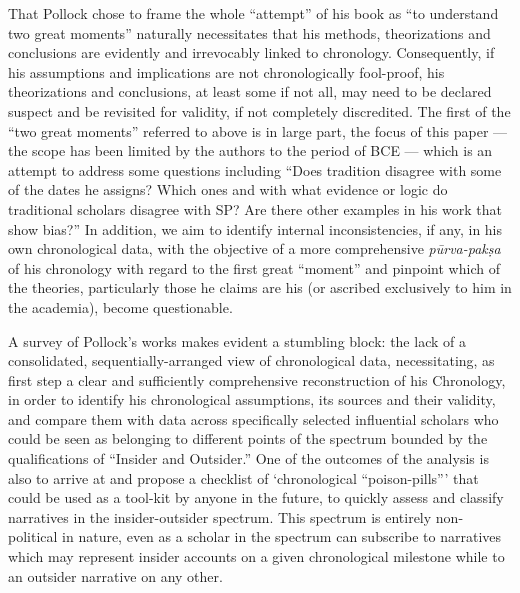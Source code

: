 That Pollock chose to frame the whole “attempt” of his book as “to understand two great moments” naturally necessitates that his methods, theorizations and conclusions are evidently and irrevocably linked to chronology. Consequently, if his assumptions and implications are not chronologically fool-proof, his theorizations and conclusions, at least some if not all, may need to be declared suspect and be revisited for validity, if not completely discredited. The first of the “two great moments” referred to above is in large part, the focus of this paper —the scope has been limited by the authors to the period of BCE — which is an attempt to address some questions including “Does tradition disagree with some of the dates he assigns? Which ones and with what evidence or logic do traditional scholars disagree with SP? Are there other examples in his work that show bias?” In addition, we aim to identify internal inconsistencies, if any, in his own chronological data, with the objective of a more comprehensive \textit{pūrva-pakṣa} of his chronology with regard to the first great “moment” and pinpoint which of the theories, particularly those he claims are his (or ascribed exclusively to him in the academia), become questionable.

\bigskip

A survey of Pollock’s works makes evident a stumbling block: the lack of a consolidated, sequentially-arranged view of chronological data, necessitating, as first step a clear and sufficiently comprehensive reconstruction of his Chronology, in order to identify his chronological assumptions, its sources and their validity, and compare them with data across specifically selected influential scholars who could be seen as belonging to different points of the spectrum bounded by the qualifications of “Insider and Outsider.” One of the outcomes of the analysis is also to arrive at and propose a checklist of ‘chronological “poison-pills”’ that could be used as a tool-kit by anyone in the future, to quickly assess and classify narratives in the insider-outsider spectrum. This spectrum is entirely non-political in nature, even as a scholar in the spectrum can subscribe to narratives which may represent insider accounts on a given chronological milestone while to an outsider narrative on any other.

